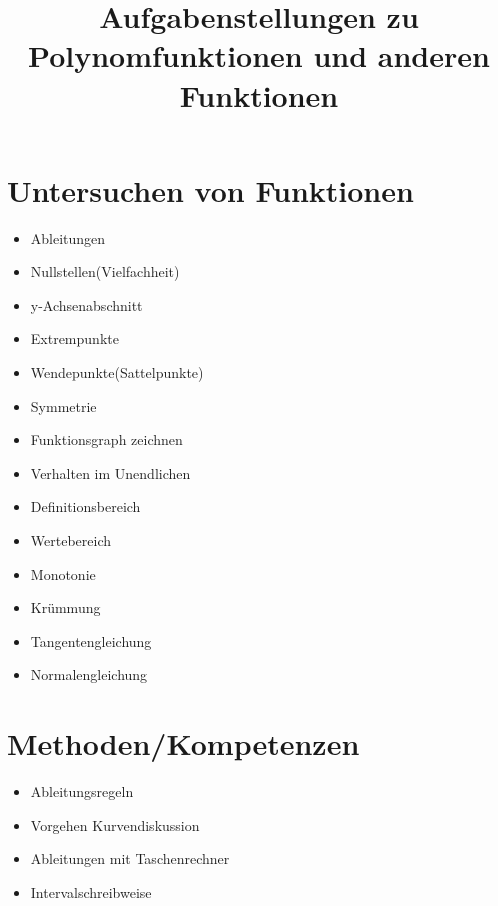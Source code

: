 \documentclass[10pt,a4paper]{article}
\begin{document}
\title{Aufgabenstellungen zu Polynomfunktionen und anderen Funktionen}

\makeatletter
\def\@maketitle{%
  \newpage
  \null
  \vskip 2em%
  \begin{center}%
  \let \footnote \thanks
    {\Huge\bfseries\@title \par}%
    \vskip 1.5em%
    {\large
      \lineskip .5em%
      \begin{tabular}[t]{c}%
        \@author
      \end{tabular}\par}%
    \vskip 1em%
    {\large \@date}%
  \end{center}%
  \par
  \vskip 1.5em}
\makeatother

\author{}
\date{}

\maketitle

\section*{Untersuchen von Funktionen}

\begin{itemize}
    \item Ableitungen
    \item Nullstellen(Vielfachheit)
    \item y-Achsenabschnitt
    \item Extrempunkte
    \item Wendepunkte(Sattelpunkte)
    \item Symmetrie
    \item Funktionsgraph zeichnen
    \item Verhalten im Unendlichen
    \item Definitionsbereich
    \item Wertebereich
    \item Monotonie
    \item Krümmung
    \item Tangentengleichung
    \item Normalengleichung
\end{itemize}

\section*{Methoden/Kompetenzen}

\begin{itemize}
    \item Ableitungsregeln
    \item Vorgehen Kurvendiskussion
    \item Ableitungen mit Taschenrechner
    \item Intervalschreibweise
\end{itemize}
\end{document}
